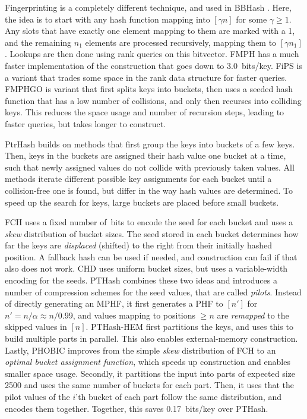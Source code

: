 Fingerprinting \cite{chapman_2011,muller_2014} is a completely different
technique, and used in BBHash \cite{bbhash}. Here, the
idea is to start with any hash function mapping into \([\gamma n]\) for some
\(\gamma \geq 1\). Any slots that have exactly one element mapping to them are
marked with a 1, and the remaining \(n_1\) elements are processed recursively,
mapping them to \([\gamma n_1]\). Lookups are then done using rank queries on this
bitvector. FMPH \cite{fmph} has a much faster implementation of the construction that goes
down to 3.0~bits/key. FiPS \cite{phf-thesis} is a variant that trades some
space in the rank data structure for faster queries. FMPHGO \cite{fmph} is
variant that first splits keys into buckets, then uses a seeded hash function
that has a low number of collisions, and only then recurses into colliding keys.
This reduces the space usage and number of recursion steps, leading to faster
queries, but takes longer to construct.

PtrHash builds on methods that first group the keys into
buckets of a few keys. Then, keys in the buckets are assigned their hash value
one bucket at a time, such that newly assigned values do not collide with
previously taken values. All methods iterate different possible key assignments
for each bucket until a collision-free one is found, but differ in the way
hash values are determined. To speed up the search for keys, large buckets are
placed before small buckets.

FCH \cite{fch} uses a fixed number of~bits to encode the seed for each bucket and
uses a \emph{skew} distribution of bucket sizes. The seed stored in each bucket
determines how far the keys are \emph{displaced} (shifted) to the right from their
initially hashed position. A fallback hash can be used if needed, and
construction can fail if that also does not work. CHD \cite{chd} uses uniform
bucket sizes, but uses a variable-width encoding for the seeds.
PTHash \cite{pthash} combines these two ideas and introduces a number of
compression schemes for the seed values, that are called \emph{pilots}. Instead of
directly generating an MPHF, it first generates a PHF to \([n']\) for
\(n'=n/\alpha \approx n/0.99\), and values mapping to positions \(\geq n\) are \emph{remapped} to
the skipped values in \([n]\). PTHash-HEM \cite{pthash-2} first partitions the keys, and uses this
to build multiple parts in parallel. This also enables external-memory construction.
Lastly, PHOBIC \cite{phobic} improves from the simple \emph{skew} distribution of
FCH to an \emph{optimal bucket assignment function}, which speeds up construction and
enables smaller space usage. Secondly, it partitions the input into parts of
expected size
2500 and uses the same number of buckets for each part. Then, it uses that the
pilot values of the \(i\)'th bucket of each part follow the same distribution, and
encodes them together. Together, this saves 0.17~bits/key over PTHash.
